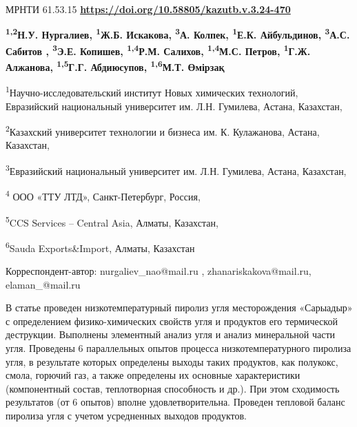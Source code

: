 \newpage
МРНТИ 61.53.15
\hfill {\bfseries \href{https://doi.org/10.58805/kazutb.v.3.24-470}{https://doi.org/10.58805/kazutb.v.3.24-470}}


\begin{center}
{\bfseries \textsuperscript{1,2}Н.У. Нургалиев\envelope, \textsuperscript{1}Ж.Б. Искакова\envelope, \textsuperscript{3}А. Колпек, \textsuperscript{1}Е.К. Айбульдинов\envelope, \textsuperscript{3}А.С. Сабитов , \textsuperscript{3}Э.Е. Копишев, \textsuperscript{1,4}Р.М. Салихов, \textsuperscript{1,4}М.С. Петров, \textsuperscript{1}Г.Ж. Алжанова, \textsuperscript{1,5}Г.Г. Абдиюсупов, \textsuperscript{1,6}М.Т. Өмірзақ}

\textsuperscript{1}Научно-исследовательский институт Новых химических
технологий, Евразийский национальный университет им. Л.Н. Гумилева,
Астана, Казахстан,

\textsuperscript{2}Казахский университет технологии и бизнеса им. К.
Кулажанова, Астана, Казахстан,

\textsuperscript{3}Евразийский национальный университет им. Л.Н.
Гумилева, Астана, Казахстан,

\textsuperscript{4} ООО «ТТУ ЛТД», Санкт-Петербург, Россия,

\textsuperscript{5}CCS Services -- Central Asia, Алматы, Казахстан,

\textsuperscript{6}Sauda Exports\&Import, Алматы, Казахстан
\end{center}
\envelope Корреспондент-автор: nurgaliev\_nao@mail.ru , zhanariskakova@mail.ru,
elaman\_@mail.ru


В статье проведен низкотемпературный пиролиз угля месторождения
«Сарыадыр» с определением физико-химических свойств угля и продуктов его
термической деструкции. Выполнены элементный анализ угля и анализ
минеральной части угля. Проведены 6 параллельных опытов процесса
низкотемпературного пиролиза угля, в результате которых определены
выходы таких продуктов, как полукокс, смола, горючий газ, а также
определены их основные характеристики (компонентный состав, теплотворная
способность и др.). При этом сходимость результатов (от 6 опытов) вполне
удовлетворительна. Проведен тепловой баланс пиролиза угля с учетом
усредненных выходов продуктов.

